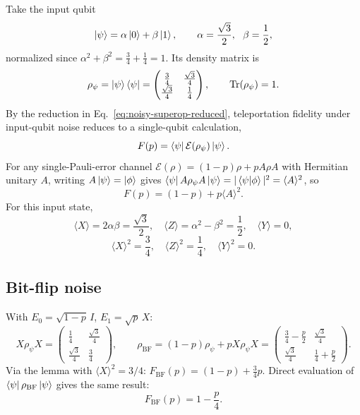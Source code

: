 \documentclass[11pt]{article}
\begin{document}
Take the input qubit
\begin{equation}
\ket{\psi} = \alpha\ket{0}+\beta\ket{1}, \qquad \alpha=\frac{\sqrt3}{2},\ \ \beta=\frac12,
\label{eq:test-state}
\end{equation}
normalized since $\alpha^2+\beta^2=\tfrac34+\tfrac14=1$. Its density matrix is
\begin{equation}
\rho_\psi = \ket{\psi}\bra{\psi} = \begin{pmatrix} \tfrac34 & \tfrac{\sqrt3}{4}\\ \tfrac{\sqrt3}{4} & \tfrac14\end{pmatrix}, \qquad \Tr(\rho_\psi)=1.
\label{eq:rho-psi-numeric}
\end{equation}
By the reduction in Eq.~\eqref{eq:noisy-superop-reduced}, teleportation fidelity under input-qubit noise reduces to a single-qubit calculation,
\begin{equation}
F(p) = \bra{\psi}\mathcal{E}(\rho_\psi)\ket{\psi}.
\label{eq:F-single-qubit}
\end{equation}
For any single-Pauli-error channel $\mathcal{E}(\rho)=(1-p)\rho+pA\rho A$ with Hermitian unitary $A$, writing $A\ket{\psi}=\ket{\phi}$ gives $\bra{\psi}A\rho_\psi A\ket{\psi}=|\braket{\psi}{\phi}|^2=\langle A\rangle^2$, so
\begin{equation}
F(p) = (1-p) + p\langle A\rangle^2.
\label{eq:F-lemma}
\end{equation}
For this input state,
\begin{equation}
\langle X\rangle = 2\alpha\beta = \frac{\sqrt3}{2}, \quad \langle Z\rangle = \alpha^2-\beta^2 = \frac12, \quad \langle Y\rangle = 0,
\label{eq:expectations}
\end{equation}
\begin{equation}
\langle X\rangle^2 = \frac34, \quad \langle Z\rangle^2 = \frac14, \quad \langle Y\rangle^2 = 0.
\label{eq:expectations-sq}
\end{equation}

\subsection{Bit-flip noise}

With $E_0=\sqrt{1-p}\,I$, $E_1=\sqrt{p}\,X$:
\begin{equation}
X\rho_\psi X = \begin{pmatrix}\tfrac14 & \tfrac{\sqrt3}{4}\\ \tfrac{\sqrt3}{4} & \tfrac34\end{pmatrix}, \qquad
\rho_{\text{BF}} = (1-p)\rho_\psi + pX\rho_\psi X = \begin{pmatrix}\tfrac34-\tfrac{p}{2} & \tfrac{\sqrt3}{4}\\ \tfrac{\sqrt3}{4} & \tfrac14+\tfrac{p}{2}\end{pmatrix}.
\label{eq:bf-rho}
\end{equation}
Via the lemma with $\langle X\rangle^2=3/4$: $F_{\text{BF}}(p)=(1-p)+\tfrac34 p$. Direct evaluation of $\bra{\psi}\rho_{\text{BF}}\ket{\psi}$ gives the same result:
\begin{equation}
F_{\text{BF}}(p) = 1-\frac{p}{4}.
\label{eq:F-BF}
\end{equation}
\end{document}
